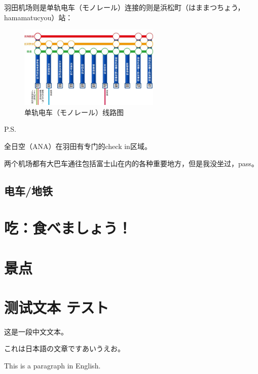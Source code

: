 \documentclass{article}
\newcommand{\jp}[1]{{\japanesefont #1}}
\begin{document}
羽田机场则是单轨电车（モノレール）连接的则是浜松町（はままつちょう，hamamatucyou）站：
\begin{figure}[h!]
    \centering
    \includegraphics[width=0.6\textwidth]{./fig/routemap_monorail.jpg} %
    \caption{单轨电车（モノレール）线路图\protect\footnotemark}
\end{figure}

P.S.\par
全日空（ANA）在羽田有专门的check in区域。\par
两个机场都有大巴车通往包括富士山在内的各种重要地方，但是我没坐过，pass。

\subsection{电车/地铁}


\section{吃：食べましょう！}

\section{景点}


\section*{测试文本 テスト}
这是一段中文文本。\par
\jp{これは日本語の文章です}あいうえお。\par
This is a paragraph in English.
\end{document}

